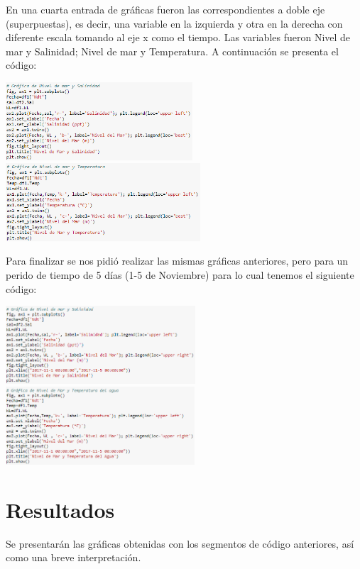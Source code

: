 \documentclass[12pt]{article}
\begin{document}
En una cuarta entrada de gráficas fueron las correspondientes a doble eje (superpuestas), es decir, una variable en la izquierda y otra en la derecha con diferente escala tomando al eje x como el tiempo. Las variables fueron  Nivel de mar y Salinidad; Nivel de mar y Temperatura. A continuación se presenta el código:
\begin{center}
	\includegraphics[height=2.9cm]{e1.png}
    \includegraphics[height=2.9cm]{e2.png}
\end{center}
Para finalizar se nos pidió realizar las mismas gráficas anteriores, pero para un perido de tiempo de 5 días (1-5 de Noviembre) para lo cual tenemos el siguiente código:
\begin{center}
	\includegraphics[height=2.9cm]{f1.png}
    \includegraphics[height=2.9cm]{f2.png}
\end{center}
\section*{Resultados}
Se presentarán las gráficas obtenidas con los segmentos de código anteriores, así como una breve interpretación.
\end{document}
